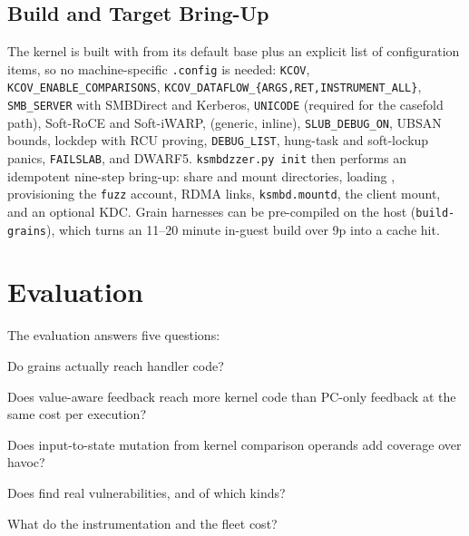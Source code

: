 \documentclass{article}
\begin{document}
\subsection{Build and Target Bring-Up}

The kernel is built with \virtme from its default base plus an explicit list
of configuration items, so no machine-specific \texttt{.config} is needed:
\texttt{KCOV}, \texttt{KCOV\_ENABLE\_COMPARISONS},
\texttt{KCOV\_DATAFLOW\_\{ARGS,RET,INSTRUMENT\_ALL\}}, \texttt{SMB\_SERVER}
with SMBDirect and Kerberos, \texttt{UNICODE} (required for the casefold
path), Soft-RoCE and Soft-iWARP, \kasan (generic, inline), \texttt{SLUB\_DEBUG\_ON},
UBSAN bounds, lockdep with RCU proving, \texttt{DEBUG\_LIST}, hung-task and
soft-lockup panics, \texttt{FAILSLAB}, and DWARF5. \texttt{ksmbdzzer.py init}
then performs an idempotent nine-step bring-up: share and mount directories,
loading \ksmbd, provisioning the \texttt{fuzz} account, RDMA links,
\texttt{ksmbd.mountd}, the client mount, and an optional KDC. Grain harnesses
can be pre-compiled on the host (\texttt{build-grains}), which turns an 11--20
minute in-guest build over 9p into a cache hit.


\section{Evaluation}\label{sec:eval}

The evaluation answers five questions:
\begin{description}[nosep, font=\normalfont\bfseries]
  \item[RQ1] Do grains actually reach \ksmbd handler code?
  \item[RQ2] Does value-aware feedback reach more kernel code than PC-only
             feedback at the same cost per execution?
  \item[RQ3] Does input-to-state mutation from kernel comparison operands add
             coverage over havoc?
  \item[RQ4] Does \toolname find real vulnerabilities, and of which kinds?
  \item[RQ5] What do the instrumentation and the fleet cost?
\end{description}
\end{document}
